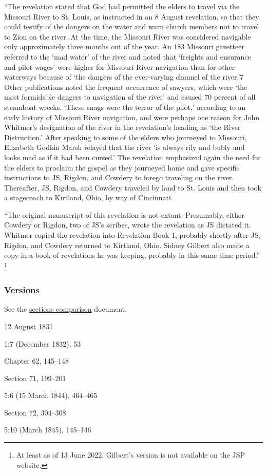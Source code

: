 			``The revelation stated that God had permitted the elders to travel via the Missouri River to St. Louis, as instructed in an 8 August revelation, so that they could testify of the dangers on the water and warn church members not to travel to Zion on the river. At the time, the Missouri River was considered navigable only approximately three months out of the year. An 183 Missouri gazetteer referred to the `mad water' of the river and noted that `freights and ensurance and pilot-wages' were higher for Missouri River navigation than for other waterways because of `the dangers of the ever-varying channel of the river.'7 Other publications noted the frequent occurrence of sawyers, which were `the most formidable dangers to navigation of the river' and caused 70 percent of all steamboat wrecks. `These snags were the terror of the pilot,' according to an early history of Missouri River navigation, and were perhaps one reason for John Whitmer's designation of the river in the revelation's heading as `the River Distruction.' After speaking to some of the elders who journeyed to Missouri, Elizabeth Godkin Marsh relayed that the river `is always rily and bubly and looks mad as if it had been cursed.' The revelation emphasized again the need for the elders to proclaim the gospel as they journeyed home and gave specific instructions to JS, Rigdon, and Cowdery to forego traveling on the river. Thereafter, JS, Rigdon, and Cowdery traveled by land to St. Louis and then took a stagecoach to Kirtland, Ohio, by way of Cincinnati.
			
			``The original manuscript of this revelation is not extant. Presumably, either Cowdery or Rigdon, two of JS's scribes, wrote the revelation as JS dictated it. Whitmer copied the revelation into Revelation Book 1, probably shortly after JS, Rigdon, and Cowdery returned to Kirtland, Ohio. Sidney Gilbert also made a copy in a book of revelations he was keeping, probably in this same time period.''%
				\footnote{%
					At least as of 13 June 2022, Gilbert's version is not available on the JSP website.
					}
		
	\subsubsection{Versions}
		\label{DC61-V}
		
		See the \href{https://drive.google.com/file/d/1goAvNz8jS4R8slYfMG_db55Ty2z_vmgK/view?usp=sharing}{sections comparison} document.
	
		\begin{compactdesc}
			\item[JSP] \hyperref[EMS-1831-JS-12-AUG-1831]{12 August 1831}
			\item[EMS] 1:7 (December 1832), 53
			\item[BC] Chapter 62, 145--148
			\item[DC 1835] Section 71, 199--201
			\item[TS] 5:6 (15 March 1844), 464--465
			\item[DC 1844] Section 72, 304--308
			\item[MS] 5:10 (March 1845), 145--146
		\end{compactdesc}

